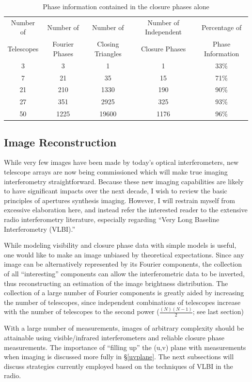 \documentclass[12pt]{article}
\begin{document}
\begin{table}
\footnotesize
\caption {Phase information contained in the closure phases alone
\label{monnier_table1}}
\begin{center}
\begin{tabular}{ccccc}
Number of  & Number of & Number of & Number of Independent & Percentage of \\
Telescopes & Fourier Phases & Closing Triangles & Closure Phases & Phase Information \\
\hline
3 & 3 & 1 & 1 & 33\% \\
7 & 21 & 35 & 15 & 71\% \\
21 & 210 & 1330 & 190 & 90\% \\
27 & 351 & 2925 & 325 & 93\% \\
50 & 1225 & 19600 & 1176 & 96\% \\
\end{tabular}
\end{center}
\end{table}


\subsection{Image Reconstruction}
While very few images have been made by today's optical
interferometers, new telescope arrays are now being commissioned which
will make true imaging interferometry straightforward.  Because these
new imaging capabilities are likely to have significant impacts over
the next decade, I wish to review the basic principles of apertures
synthesis imaging.  However, I will restrain myself from excessive
elaboration here,
and instead refer the interested reader to the extensive
radio interferometry literature, especially regarding ``Very Long
Baseline Interferometry (VLBI).''

While modeling visibility and closure phase data with simple models is
useful, one would like to make an image unbiased by theoretical
expectations.  Since any image can be alternatively represented by its
Fourier components, the collection of all ``interesting'' components
can allow the interferometric data to be inverted, thus reconstructing
an estimation of the image brightness distribution.  The collection of a large
number of Fourier components is greatly aided by increasing the number
of telescopes, since independent combinations of telescopes increase
with the number of telescopes to the second power 
($\frac{(N)(N-1)}{2}$; see last section)
  
With a large number of measurements, images of arbitrary complexity
should be attainable using visible/infrared interferometers and
reliable closure phase measurements.  The importance of ``filling up''
the (u,v) plane with measurements when imaging is discussed more fully
in \S\ref{uvplane}.  The next subsections will discuss strategies
currently employed based on the techniques of VLBI in the radio.
\end{document}
